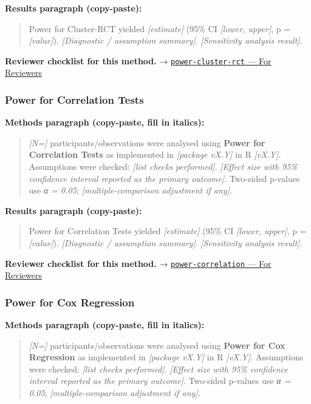 \documentclass[
]{article}
\begin{document}
\textbf{Results paragraph (copy-paste):}

\begin{quote}
Power for Cluster-RCT yielded \emph{{[}estimate{]}} (95\% CI
\emph{{[}lower, upper{]}}, p = \emph{{[}value{]}}). \emph{{[}Diagnostic
/ assumption summary{]}}. \emph{{[}Sensitivity analysis result{]}}.
\end{quote}

\textbf{Reviewer checklist for this method.} →
\href{../chapters/05-power/power-cluster-rct.Rmd\#for-reviewers}{\texttt{power-cluster-rct}
--- For Reviewers}

\subsubsection{Power for Correlation
Tests}\label{power-for-correlation-tests}

\textbf{Methods paragraph (copy-paste, fill in italics):}

\begin{quote}
\emph{{[}N={]}} participants/observations were analysed using
\textbf{Power for Correlation Tests} as implemented in \emph{{[}package
vX.Y{]}} in R \emph{{[}vX.Y{]}}. Assumptions were checked: \emph{{[}list
checks performed{]}}. \emph{{[}Effect size with 95\% confidence interval
reported as the primary outcome{]}}. Two-sided p-values use \emph{α =
0.05}; \emph{{[}multiple-comparison adjustment if any{]}}.
\end{quote}

\textbf{Results paragraph (copy-paste):}

\begin{quote}
Power for Correlation Tests yielded \emph{{[}estimate{]}} (95\% CI
\emph{{[}lower, upper{]}}, p = \emph{{[}value{]}}). \emph{{[}Diagnostic
/ assumption summary{]}}. \emph{{[}Sensitivity analysis result{]}}.
\end{quote}

\textbf{Reviewer checklist for this method.} →
\href{../chapters/05-power/power-correlation.Rmd\#for-reviewers}{\texttt{power-correlation}
--- For Reviewers}

\subsubsection{Power for Cox Regression}\label{power-for-cox-regression}

\textbf{Methods paragraph (copy-paste, fill in italics):}

\begin{quote}
\emph{{[}N={]}} participants/observations were analysed using
\textbf{Power for Cox Regression} as implemented in \emph{{[}package
vX.Y{]}} in R \emph{{[}vX.Y{]}}. Assumptions were checked: \emph{{[}list
checks performed{]}}. \emph{{[}Effect size with 95\% confidence interval
reported as the primary outcome{]}}. Two-sided p-values use \emph{α =
0.05}; \emph{{[}multiple-comparison adjustment if any{]}}.
\end{quote}
\end{document}
